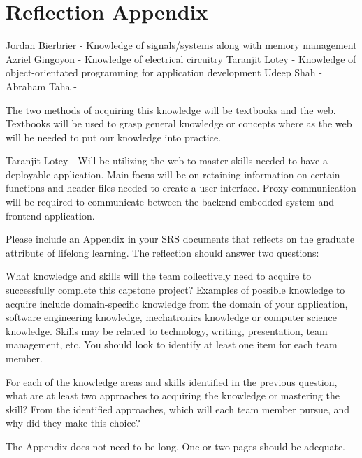 \documentclass[12pt]{article}
\begin{document}
\section*{Reflection Appendix}

Jordan Bierbrier - Knowledge of signals/systems along with memory management
Azriel Gingoyon - Knowledge of electrical circuitry  
Taranjit Lotey - Knowledge of object-orientated programming for application development 
Udeep Shah - 
Abraham Taha - 


The two methods of acquiring this knowledge will be textbooks and the web. Textbooks will be used to grasp general knowledge or concepts where as the web will be needed to put our knowledge into practice.

Taranjit Lotey - Will be utilizing the web to master skills needed to have a deployable application. Main focus will be on retaining information on certain functions and header files needed to create a user interface. Proxy communication will be required to communicate between the backend embedded system and frontend application.

Please include an Appendix in your SRS documents that reflects on the graduate attribute of lifelong learning.  The reflection should answer two questions:

What knowledge and skills will the team collectively need to acquire to successfully complete this capstone project? Examples of possible knowledge to acquire include domain-specific knowledge from the domain of your application, software engineering knowledge, mechatronics knowledge or computer science knowledge. Skills may be related to technology, writing, presentation, team management, etc. You should look to identify at least one item for each team member.

For each of the knowledge areas and skills identified in the previous question, what are at least two approaches to acquiring the knowledge or mastering the skill? From the identified approaches, which will each team member pursue, and why did they make this choice?

The Appendix does not need to be long.  One or two pages should be adequate.
\end{document}
